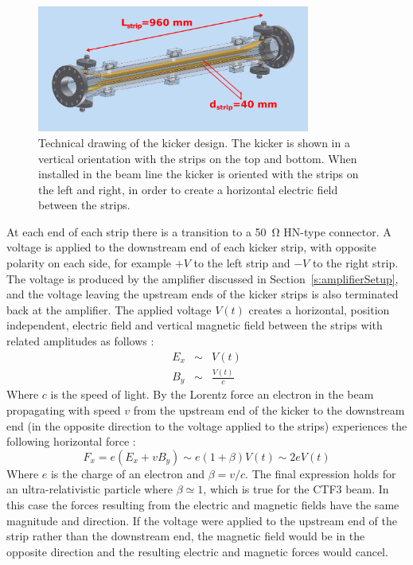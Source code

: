 \begin{figure}
  \centering
  \includegraphics[width=0.8\textwidth]{Figures/optics/kickerSchematic}
  \caption{Technical drawing of the kicker design. The kicker is shown in a vertical orientation with the strips on the top and bottom. When installed in the beam line the kicker is oriented with the strips on the left and right, in order to create a horizontal electric field between the strips.}
  \label{f:kickerSchematic}
\end{figure}

At each end of each strip there is a transition to a 50~\(\mathrm{\Omega}\) HN-type connector. A voltage is applied to the downstream end of each kicker strip, with opposite polarity on each side, for example \(+V\) to the left strip and \(-V\) to the right strip. The voltage is produced by the amplifier discussed in Section~\ref{s:amplifierSetup}, and the voltage leaving the upstream ends of the kicker strips is also terminated back at the amplifier. The applied voltage \(V(t)\) creates a horizontal, position independent, electric field and vertical magnetic field between the strips with related amplitudes as follows \cite{byrdKicker}:
\begin{eqnarray}
E_x &\sim& V(t) \\
B_y &\sim& \frac{V(t)}{c}
\end{eqnarray}
Where \(c\) is the speed of light. By the Lorentz force an electron in the beam propagating with speed \(v\) from the upstream end of the kicker to the downstream end (in the opposite direction to the voltage applied to the strips) experiences the following horizontal force \cite{byrdKicker}:
\begin{equation}
F_x = e(E_x + vB_y) \sim e(1+\beta)V(t) \sim 2eV(t)
\end{equation}
Where \(e\) is the charge of an electron and \(\beta = v/c\). The final expression holds for an ultra-relativistic particle where \(\beta \simeq 1\), which is true for the CTF3 beam. In this case the forces resulting from the electric and magnetic fields have the same magnitude and direction. If the voltage were applied to the upstream end of the strip rather than the downstream end, the magnetic field would be in the opposite direction and the resulting electric and magnetic forces would cancel. 

